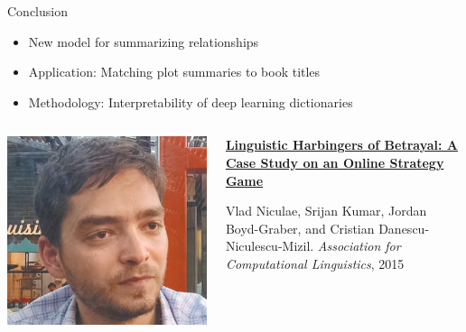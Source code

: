 \documentclass[xcolor=dvipsnames]{beamer}
\begin{document}
\begin{frame}[plain]
\vspace*{-1pt}
\end{frame}

\begin{frame}{Conclusion}


  \begin{itemize}
    \item New model for summarizing relationships
    \item Application: Matching plot summaries to book titles
    \item Methodology: Interpretability of deep learning dictionaries
  \end{itemize}

\end{frame}


\begin{frame}{}

  \begin{columns}
        \includegraphics[width=0.7\linewidth]{general_figures/vlad}
        \begin{block}{{\bf
              \href{http://cs.colorado.edu/~jbg//docs/2015_acl_diplomacy.pdf}{Linguistic Harbingers of Betrayal: A Case Study on an Online Strategy Game}}}

          Vlad Niculae, Srijan Kumar, Jordan Boyd-Graber, and Cristian
          Danescu-Niculescu-Mizil. \emph{Association for Computational Linguistics}, 2015
        \end{block}

  \end{columns}
\end{frame}
\end{document}
